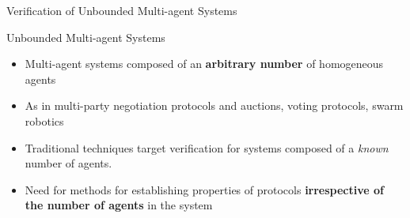 \documentclass[10pt]{beamer}
\begin{document}


\begin{frame}{Verification of Unbounded Multi-agent Systems}


\begin{figure}
\end{figure}

\end{frame}



\begin{frame}{Unbounded Multi-agent Systems}

\begin{itemize} \itemsep 2em
    \item Multi-agent systems composed of an {\bf arbitrary number} of
        homogeneous agents

    \item As in multi-party negotiation protocols and auctions, voting
        protocols, swarm robotics

    \item  Traditional techniques target  verification for
    systems composed of a {\em known} number of agents. 

    \item Need for methods for establishing properties of protocols {\bf
        irrespective of the number of agents} in the system
\end{itemize}

\end{frame}

\end{document}
